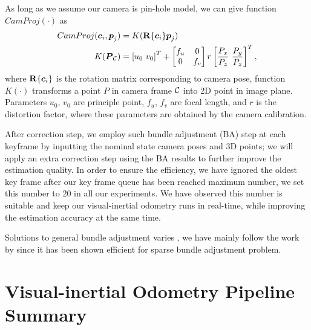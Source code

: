 As long as we assume our camera is pin-hole model, we can give function $CamProj(\cdot)$ as
\begin{align}
	\label{c2}
	CamProj(\boldsymbol{c}_i, \boldsymbol{p}_j) &= K (\mathbf{R} \{ \boldsymbol{c}_i \} \boldsymbol{p}_j) \\
	K(\boldsymbol{P}_{\mathcal{C}}) &= \left[ u_0 \ v_0 \right]^T + \begin{bmatrix} f_u & 0 \\
															 0 & f_v
											  \end{bmatrix} r \left[ \frac{P_x}{P_z} \ \frac{P_y}{P_z} \right]^T,
\end{align}
where $\mathbf{R} \{ \boldsymbol{c}_i \}$ is the rotation matrix corresponding to camera pose, function $K(\cdot)$ transforms a point $P$ in camera frame $\mathcal{C}$ into 2D point in image plane. Parameters $u_0$, $v_0$ are principle point, $f_u$, $f_v$ are focal length, and $r$ is the distortion factor, where these parameters are obtained by the camera calibration.

After correction step, we employ such bundle adjustment (BA) step at each keyframe by inputting the nominal state camera poses and 3D points; we will apply an extra correction step using the BA results to further improve the estimation quality. In order to ensure the efficiency, we have ignored the oldest key frame after our key frame queue has been reached maximum number, we set this number to 20 in all our experiments. We have observed this number is suitable and keep our visual-inertial odometry runs in real-time, while improving the estimation accuracy at the same time.

Solutions to general bundle adjustment varies \cite{wu2011multicore, triggs1999bundle, lourakis2009sba}, we have mainly follow the work by \cite{wu2011multicore} since it has been shown efficient for sparse bundle adjustment problem.

\section{Visual-inertial Odometry Pipeline Summary}
\label{sec:pipeline_summary}

